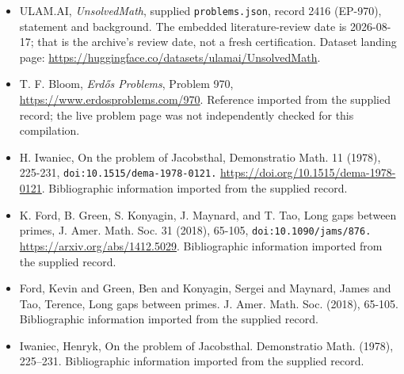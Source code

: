 \documentclass[11pt,a4paper]{article}
\begin{document}
{\small

\begin{itemize}

\item[\hypertarget{source:2416:1}{S1}] ULAM.AI, \emph{UnsolvedMath}, supplied \texttt{problems.json}, record 2416 (EP-970), statement and background. The embedded literature-review date is 2026-08-17; that is the archive’s review date, not a fresh certification. Dataset landing page: \url{https://huggingface.co/datasets/ulamai/UnsolvedMath}.

\item[\hypertarget{source:2416:2}{S2}] T. F. Bloom, \emph{Erdős Problems}, Problem 970, \url{https://www.erdosproblems.com/970}. Reference imported from the supplied record; the live problem page was not independently checked for this compilation.

\item[\hypertarget{source:2416:3}{S3}] H. Iwaniec, On the problem of Jacobsthal, Demonstratio Math. 11 (1978), 225-231, \nolinkurl{doi:10.1515/dema-1978-0121.} \url{https://doi.org/10.1515/dema-1978-0121}. Bibliographic information imported from the supplied record.

\item[\hypertarget{source:2416:4}{S4}] K. Ford, B. Green, S. Konyagin, J. Maynard, and T. Tao, Long gaps between primes, J. Amer. Math. Soc. 31 (2018), 65-105, \nolinkurl{doi:10.1090/jams/876.} \url{https://arxiv.org/abs/1412.5029}. Bibliographic information imported from the supplied record.

\item[\hypertarget{source:2416:5}{S5}] Ford, Kevin and Green, Ben and Konyagin, Sergei and Maynard, James and Tao, Terence, Long gaps between primes. J. Amer. Math. Soc. (2018), 65-105. Bibliographic information imported from the supplied record.

\item[\hypertarget{source:2416:6}{S6}] Iwaniec, Henryk, On the problem of {J}acobsthal. Demonstratio Math. (1978), 225--231. Bibliographic information imported from the supplied record.

\end{itemize}

}

\label{end:2416}
\end{document}
